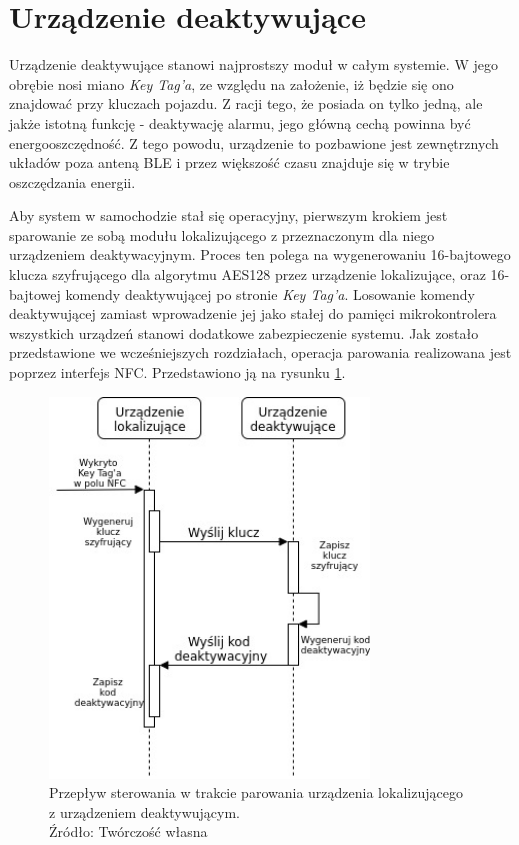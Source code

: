 \section{Urządzenie deaktywujące}
\label{key_tag}

Urządzenie deaktywujące stanowi najprostszy moduł w całym systemie. W jego obrębie nosi miano \textit{Key Tag'a}, ze względu na założenie, iż będzie się ono znajdować przy kluczach pojazdu. Z racji tego, że posiada on tylko jedną, ale jakże istotną funkcję - deaktywację alarmu, jego główną cechą powinna być energooszczędność. Z tego powodu, urządzenie to  pozbawione jest zewnętrznych układów poza anteną BLE i przez większość czasu znajduje się w trybie oszczędzania energii. 

Aby system w samochodzie stał się operacyjny, pierwszym krokiem jest sparowanie ze sobą modułu lokalizującego z przeznaczonym dla niego urządzeniem deaktywacyjnym. Proces ten polega na wygenerowaniu 16-bajtowego klucza szyfrującego dla algorytmu AES128 przez urządzenie lokalizujące, oraz 16-bajtowej komendy deaktywującej po stronie \textit{Key Tag'a}. Losowanie komendy deaktywującej zamiast wprowadzenie jej jako stałej do pamięci mikrokontrolera wszystkich urządzeń stanowi dodatkowe zabezpieczenie systemu. Jak zostało przedstawione we wcześniejszych rozdziałach, operacja parowania realizowana jest poprzez interfejs NFC. Przedstawiono ją na rysunku \ref{fig:image_soft_keytag_key exchange}.

\begin{figure}[H]
	\centering
	\includegraphics[width=8.5cm]{img/software/keytag/Key_exchange.jpg}
	\caption{Przepływ sterowania w trakcie parowania urządzenia lokalizującego z urządzeniem deaktywującym. 
	\\Źródło: Twórczość własna}
	\label{fig:image_soft_keytag_key exchange}
\end{figure}



